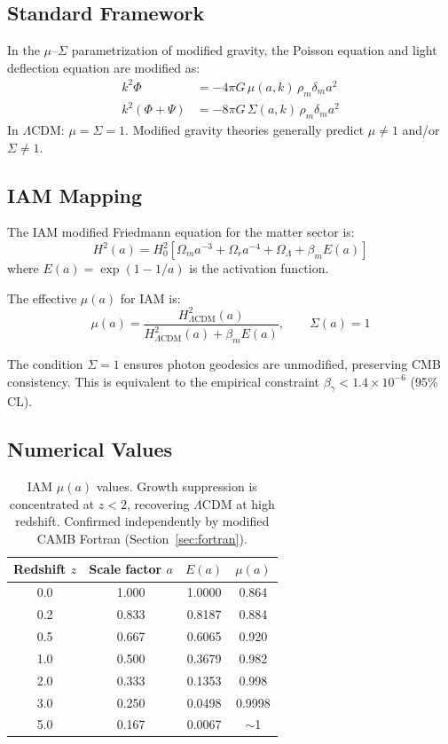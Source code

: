 \documentclass[11pt,letterpaper]{article}
\begin{document}
\subsection{Standard Framework}

In the $\mu$--$\Sigma$ parametrization of modified gravity, the Poisson equation and light deflection equation are modified as:
\begin{align}
k^2 \Phi &= -4\pi G\, \mu(a,k)\, \rho_m \delta_m a^2 \label{eq:poisson}\\
k^2(\Phi + \Psi) &= -8\pi G\, \Sigma(a,k)\, \rho_m \delta_m a^2 \label{eq:deflection}
\end{align}
In $\Lambda$CDM: $\mu = \Sigma = 1$. Modified gravity theories generally predict $\mu \neq 1$ and/or $\Sigma \neq 1$.

\subsection{IAM Mapping}

The IAM modified Friedmann equation for the matter sector is:
\begin{equation}
H^2(a) = H_0^2\left[\Omega_m a^{-3} + \Omega_r a^{-4} + \Omega_\Lambda + \beta_m E(a)\right]
\end{equation}
where $E(a) = \exp(1 - 1/a)$ is the activation function.

The effective $\mu(a)$ for IAM is:
\begin{equation}
\boxed{\mu(a) = \frac{H^2_{\Lambda\text{CDM}}(a)}{H^2_{\Lambda\text{CDM}}(a) + \beta_m E(a)}, \qquad \Sigma(a) = 1}
\label{eq:mu_iam}
\end{equation}

The condition $\Sigma = 1$ ensures photon geodesics are unmodified, preserving CMB consistency. This is equivalent to the empirical constraint $\beta_\gamma < 1.4 \times 10^{-6}$ (95\% CL).

\subsection{Numerical Values}

\begin{table}[h]
\centering
\begin{tabular}{cccc}
\toprule
Redshift $z$ & Scale factor $a$ & $E(a)$ & $\mu(a)$ \\
\midrule
0.0 & 1.000 & 1.0000 & 0.864 \\
0.2 & 0.833 & 0.8187 & 0.884 \\
0.5 & 0.667 & 0.6065 & 0.920 \\
1.0 & 0.500 & 0.3679 & 0.982 \\
2.0 & 0.333 & 0.1353 & 0.998 \\
3.0 & 0.250 & 0.0498 & 0.9998 \\
5.0 & 0.167 & 0.0067 & $\sim$1 \\
\bottomrule
\end{tabular}
\caption{IAM $\mu(a)$ values. Growth suppression is concentrated at $z < 2$, recovering $\Lambda$CDM at high redshift. Confirmed independently by modified CAMB Fortran (Section~\ref{sec:fortran}).}
\label{tab:mu_values}
\end{table}
\end{document}
